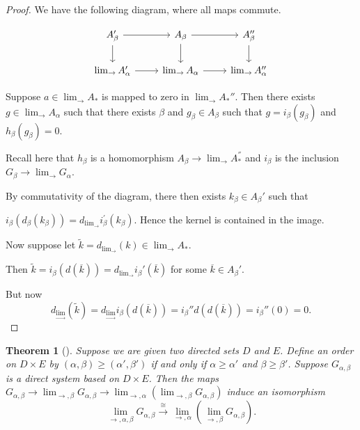 \documentclass[reqno]{amsart}
\newtheorem{theorem}{Theorem}[section]
\theoremstyle{definition}
\theoremstyle{remark}
\begin{document}
\begin{proof}
    We have the following diagram, where all
    maps commute.

\[\begin{tikzcd}
	{A_{\beta}'} & {A_{\beta}} & {A_{\beta}''} \\
	{\lim_{\rightarrow}A_{\alpha}'} & {\lim_{\rightarrow}A_{\alpha}} & {\lim_{\rightarrow}A_{\alpha}''}
	\arrow[from=1-1, to=1-2]
	\arrow[from=1-1, to=2-1]
	\arrow[from=1-2, to=1-3]
	\arrow[from=1-2, to=2-2]
	\arrow[from=1-3, to=2-3]
	\arrow[from=2-1, to=2-2]
	\arrow[from=2-2, to=2-3]
\end{tikzcd}\]

Suppose
$a \in \lim_{\rightarrow} A_*$ is mapped to zero
in $\lim_{\rightarrow} A_*''$.
Then there exists 
$g \in \lim_{\rightarrow}A_{\alpha}$ such that
there exists $\beta$ and
$g_{\beta} \in A_{\beta}$ such that
$g = i_{\beta}(g_{\beta})$ and
$h_{\beta}(g_{\beta}) = 0$.

Recall here that
$h_{\beta}$ is a homomorphism
$A_{\beta} \to \lim_{\rightarrow}A_*^{''}$ and
$i_{\beta}$ is the inclusion
$G_{\beta} \to \lim_{\rightarrow}G_{\alpha}$.

By commutativity of the diagram, there
then exists $k_{\beta} \in 
A_{\beta}'$ such that

$i_{\beta} \left( d_{\beta} (k_{\beta}) \right) 
= d_{\lim_{\rightarrow}} i_{\beta}^{'} (k_{\beta})$.
Hence the kernel is contained in the image.

Now suppose let $\tilde{k} = 
d_{\lim_{\rightarrow}} (k) \in 
\lim_{\rightarrow}A_*$.

Then $\tilde{k} = 
i_{\beta}\left( d (\overline{k}) \right) 
= d_{\lim_{\rightarrow}}
i_{\beta}' \left( \overline{k} \right) $ for
some $\overline{k} \in A_{\beta}'$.


But now
\[
d_{\lim_{\rightarrow}} (\tilde{k})
= d_{\lim_{\rightarrow}}
i_{\beta} \left( d \left( \overline{k} \right)  \right) 
= i_{\beta}'' 
d\left( d \left( \overline{k} \right)  \right) 
= i_{\beta}'' (0) = 0.
\] 
\end{proof}

\begin{theorem}[]
    Suppose we are given two directed sets
    $D$ and $E$. Define an order on
    $D \times E$ by 
    $\left( \alpha, \beta \right) \ge 
    \left( \alpha', \beta' \right) $ if and only if
    $\alpha \ge \alpha'$ and
    $\beta \ge  \beta'$. Suppose
    $G_{\alpha, \beta}$ is a direct system
    based on $D \times E$. Then the maps
    $G_{\alpha,\beta} \to 
    \lim_{\rightarrow, \beta} G_{\alpha, \beta}
    \to \lim_{\rightarrow, \alpha}
    \left( \lim_{\rightarrow, \beta} G_{\alpha,\beta} \right) $
    induce an isomorphism
    \[
    \lim_{\rightarrow, \alpha,\beta} G_{\alpha, \beta}
    \stackrel{\cong}{\to} 
    \lim_{\rightarrow, \alpha} \left( 
    \lim_{\rightarrow, \beta} 
G_{\alpha, \beta}\right) .
    \]  
\end{theorem}
\end{document}
